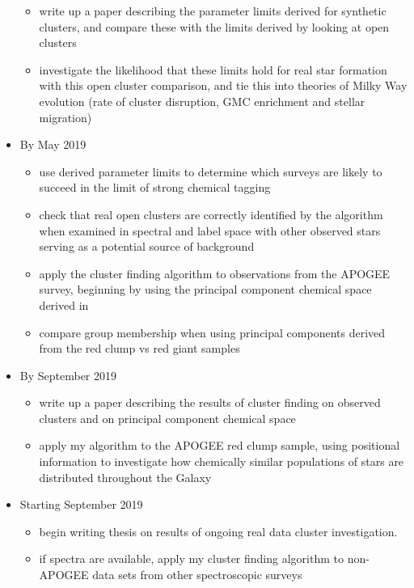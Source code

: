 \documentclass[11pt]{article}
\begin{document}
\begin{itemize}
\begin{itemize}
\item write up a paper describing the parameter limits derived for synthetic clusters, and compare these with the limits derived by looking at open clusters
\item investigate the likelihood that these limits hold for real star formation with this open cluster comparison, and tie this into theories of Milky Way evolution (rate of cluster disruption, GMC enrichment and stellar migration)
\end{itemize}
\item By May 2019
\begin{itemize}
\item use derived parameter limits to determine which surveys are likely to succeed in the limit of strong chemical tagging
\item check that real open clusters are correctly identified by the algorithm when examined in spectral and label space with other observed stars serving as a potential source of background
\item apply the cluster finding algorithm to observations from the APOGEE survey, beginning by using the principal component chemical space derived in \citet{Price-Jones2017}
\item compare group membership when using principal components derived from the red clump vs red giant samples
\end{itemize} 
\item By September 2019
\begin{itemize}
\item write up a paper describing the results of cluster finding on observed clusters and on principal component chemical space
\item apply my algorithm to the APOGEE red clump sample, using positional information to investigate how chemically similar populations of stars are distributed throughout the Galaxy
\end{itemize}
\item Starting September 2019
\begin{itemize}
\item begin writing thesis on results of ongoing real data cluster investigation.
\item if spectra are available, apply my cluster finding algorithm to non-APOGEE data sets from other spectroscopic surveys
\end{itemize}
\end{itemize}

%
\end{document}
